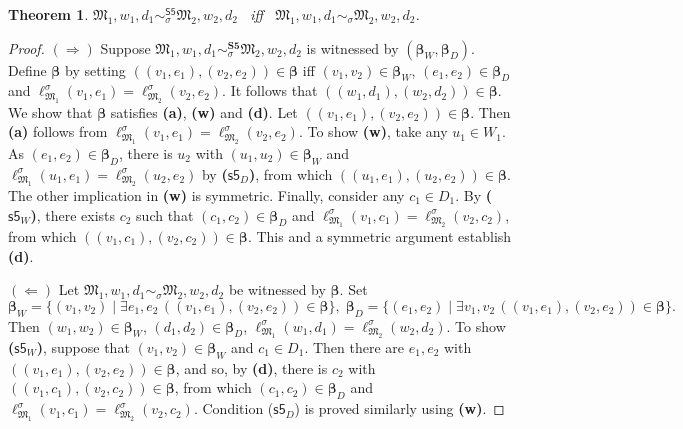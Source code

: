 \documentclass[10pt,a4paper]{amsart}
\theoremstyle{plain}
\newtheorem{thm}{Theorem}[section]
\theoremstyle{definition}
\newcommand{\bs}{\boldsymbol{\beta}}
\begin{document}
\begin{thm}\label{S5bisim}
$\mathfrak{M}_1,w_1,d_1  \sim_{\sigma}^{\mathsf{S5}} \mathfrak{M}_2,w_2,d_2$ \ iff \ 
$\mathfrak{M}_1,w_1,d_1  \sim_\sigma \mathfrak{M}_2,w_2,d_2$.
\end{thm}
%
\begin{proof}
	$(\Rightarrow)$ Suppose $\mathfrak{M}_1,w_1,d_1  \sim_\sigma^{\textbf{S5}} \mathfrak{M}_2,w_2,d_2$ is witnessed by $(\bs_{W},\bs_{D})$. Define $\bs$ by setting $((v_1,e_1),(v_2,e_2))\in \bs$ iff $(v_1,v_2)\in \bs_{W}$, $(e_1,e_2)\in \bs_{D}$ and $\ell^\sigma_{\mathfrak M_1}(v_1,e_1)=\ell^\sigma_{\mathfrak M_2}(v_2,e_2)$. It follows that $((w_1,d_1),(w_2,d_2))\in \bs$. We show that $\bs$ satisfies {\bf (a)}, {\bf (w)} and {\bf (d)}. Let $((v_1,e_1),(v_2,e_2))\in \bs$. Then {\bf (a)} follows from $\ell^\sigma_{\mathfrak M_1}(v_1,e_1)=\ell^\sigma_{\mathfrak M_2}(v_2,e_2)$. To show {\bf (w)}, take any $u_1 \in W_1$. As $(e_1,e_2) \in \bs_D$, there is $u_2$ with $(u_1,u_2) \in \bs_W$ and $\ell^\sigma_{\mathfrak M_1}(u_1,e_1) =\ell^\sigma_{\mathfrak M_2}(u_2,e_2)$ by \textbf{($\mathsf{s5}_D$)}, 
from which $((u_1,e_1),(u_2,e_2))\in \bs$. The other implication in {\bf (w)} is symmetric. Finally, consider any $c_1 \in D_1$. By \textbf{($\mathsf{s5}_W$)}, there exists $c_2$ such that $(c_1,c_2)\in \bs_{D}$ and $\ell^\sigma_{\mathfrak M_1}(v_1,c_1) =\ell^\sigma_{\mathfrak M_2}(v_2,c_2)$, from which $((v_1,c_1),(v_2,c_2))\in \bs$. This and a symmetric argument establish  {\bf (d)}.
	
	$(\Leftarrow)$ Let $\mathfrak{M}_1,w_1,d_1  \sim_\sigma \mathfrak{M}_2,w_2,d_2$ be witnessed by $\bs$. Set 
$$
\bs_{W}\!=\! \{(v_1,v_2) \mid \exists e_1,e_2\, ((v_1,e_1),(v_2,e_2))\!\in\!\bs\},\;
\bs_{D}\!=\! \{(e_1,e_2) \mid \exists v_1,v_2\, ((v_1,e_1),(v_2,e_2)) \!\in\! \bs\}.
$$
	Then $(w_1,w_2)\in \bs_{W}$, $(d_1,d_2)\in \bs_{D}$, 
	$\ell^\sigma_{\mathfrak M_1}(w_1,d_1)=\ell^\sigma_{\mathfrak M_2}(w_2,d_2)$. To show \textbf{($\mathsf{s5}_W$)}, suppose that $(v_1,v_2)\in \bs_{W}$ and $c_1\in D_1$. Then there are $e_1,e_2$ with $((v_1,e_1),(v_2,e_2))\in \bs$, and so, by {\bf (d)}, there is $c_2$ with $((v_1,c_1),(v_2,c_2)) \in \bs$, from which $(c_1,c_2) \in \bs_D$ and $\ell^\sigma_{\mathfrak M_1}(v_1,c_1) =\ell^\sigma_{\mathfrak M_2}(v_2,c_2)$. Condition ($\mathsf{s5}_D$) is proved similarly using {\bf (w)}. 
\end{proof}
\end{document}
